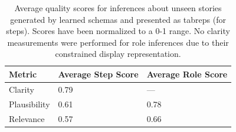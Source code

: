 \begin{table}[ht]
    \centering
    \begin{tabular}{l|l|l}
       \textbf{Metric} & \textbf{Average Step Score} & \textbf{Average Role Score} \\
       \hline
       Clarity & 0.79 & --- \\
       Plausibility & 0.61 & 0.78 \\
       Relevance & 0.57 & 0.66
    \end{tabular}
    \caption{Average quality scores for inferences about unseen stories generated by learned schemas and presented as tabreps (for steps). Scores have been normalized to a 0-1 range. No clarity measurements were performed for role inferences due to their constrained display representation.}
    \label{tab:inf_results}
\end{table}